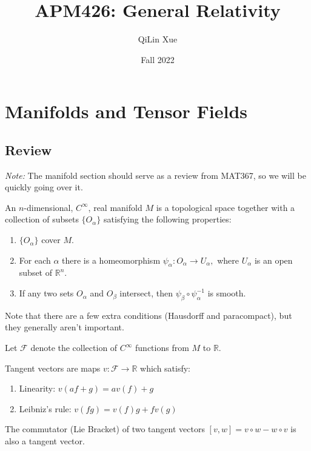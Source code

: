 \documentclass{article}
\title{APM426: General Relativity}
\author{QiLin Xue}
\date{Fall 2022}
\numberwithin{equation}{section}
\begin{document}
\maketitle
\tableofcontents
\newpage
\section{Manifolds and Tensor Fields}
\subsection{Review}
\textit{Note:} The manifold section should serve as a review from MAT367, so we will be quickly going over it.
\begin{definition}
    An $n$-dimensional, $C^\infty$, real manifold $M$ is a topological space together with a collection of subsets $\{O_\alpha\}$ satisfying the following properties:
    \begin{enumerate}
        \item $\{O_\alpha\}$ cover $M.$
        \item For each $\alpha$ there is a homeomorphism $\psi_\alpha: O_\alpha \to U_\alpha,$ where $U_\alpha$ is an open subset of $\mathbb{R}^n$.
        \item If any two sets $O_\alpha$ and $O_\beta$ intersect, then $\psi_\beta \circ \psi_\alpha^{-1}$ is smooth.
    \end{enumerate}
    Note that there are a few extra conditions (Hausdorff and paracompact), but they generally aren't important.
\end{definition}
Let $\mathcal{F}$ denote the collection of $C^\infty$ functions from $M$ to $\mathbb{R}.$
\begin{definition}
    Tangent vectors are maps $v:\mathcal{F}\to \mathbb{R}$ which satisfy:
    \begin{enumerate}
        \item Linearity: $v(af + g) = av(f) + g$
        \item Leibniz's rule: $v(fg) = v(f)g + f v(g)$ 
    \end{enumerate}
\end{definition}
The commutator (Lie Bracket) of two tangent vectors $[v,w] = v\circ w - w\circ v$ is also a tangent vector.
\end{document}
